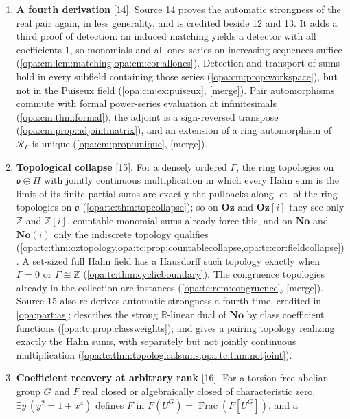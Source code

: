 \documentclass[11pt,oneside]{article}
\numberwithin{equation}{section}
\theoremstyle{definition}
\theoremstyle{remark}
\newcommand{\No}{\mathbf{No}}
\newcommand{\Oz}{\mathbf{Oz}}
\newcommand{\Og}{\mathbf{Oz}[i]}
\newcommand{\SC}{\mathbf{No}(i)}
\newcommand{\R}{\mathbb R}
\newcommand{\Z}{\mathbb Z}
\newcommand{\oo}{\mathfrak o}
\newcommand{\ct}{\operatorname{ct}}
\newcommand{\Frac}{\operatorname{Frac}}
\newcommand{\src}[1]{\textup{\textsf{\small[#1]}}}
\newcommand{\mergetag}{\textup{\textsf{\small[merge]}}}
\begin{document}
\begin{enumerate}[label=\textup{(\arabic*)},leftmargin=*,itemsep=3pt]
continuity dichotomy, nonelementarity, continuum many nonconjugate copies,
parameter-fixed copies and surcomplex versions
(\cref{opa:as:sec:adjoint,opa:as:sec:topology,opa:as:sec:model,opa:as:sec:complex}).
\item \textbf{A fourth derivation} \src{14}. Source 14 proves the automatic
strongness of the real pair again, in less generality, and is credited beside 12
and 13. It adds a third proof of detection: an induced matching yields a detector
with all coefficients $1$, so monomials and all-ones series on increasing
sequences suffice (\cref{opa:cm:lem:matching,opa:cm:cor:allones}). Detection and
transport of sums hold in every subfield containing those series
(\cref{opa:cm:prop:workspace}), but not in the Puiseux field
(\cref{opa:cm:ex:puiseux}, \mergetag). Pair automorphisms commute with formal
power-series evaluation at infinitesimals (\cref{opa:cm:thm:formal}), the adjoint
is a sign-reversed transpose (\cref{opa:cm:prop:adjointmatrix}), and an extension
of a ring automorphism of $\mathcal R_\Gamma$ is unique
(\cref{opa:cm:prop:unique}, \mergetag).
\item \textbf{Topological collapse} \src{15}. For a densely ordered $\Gamma$, the
ring topologies on $\oo\oplus\Pi$ with jointly continuous multiplication in which
every Hahn sum is the limit of its finite partial sums are exactly the pullbacks
along $\ct$ of the ring topologies on $\oo$
(\cref{opa:tc:thm:topcollapse}); so on $\Oz$ and $\Og$ they see only $\Z$ and
$\Z[i]$, countable monomial sums already force this, and on $\No$ and $\SC$ only
the indiscrete topology qualifies
(\cref{opa:tc:thm:oztopology,opa:tc:prop:countablecollapse,opa:tc:cor:fieldcollapse}).
A set-sized full Hahn field has a Hausdorff such topology exactly when $\Gamma=0$ or
$\Gamma\cong\Z$ (\cref{opa:tc:thm:cyclicboundary}). The congruence topologies already
in the collection are instances (\cref{opa:tc:rem:congruence}, \mergetag). Source 15
also re-derives automatic strongness a fourth time, credited in \cref{opa:part:as};
describes the strong $\R$-linear dual of $\No$ by class coefficient functions
(\cref{opa:tc:prop:classweights}); and gives a pairing topology realizing exactly the
Hahn sums, with separately but not jointly continuous multiplication
(\cref{opa:tc:thm:topologicalsums,opa:tc:thm:notjoint}).
\item \textbf{Coefficient recovery at arbitrary rank} \src{16}. For a torsion-free
abelian group $G$ and $F$ real closed or algebraically closed of characteristic
zero, $\exists y\,(y^2=1+x^4)$ defines $F$ in $F(U^G)=\Frac(F[U^G])$, and a

\end{enumerate}
\end{document}
